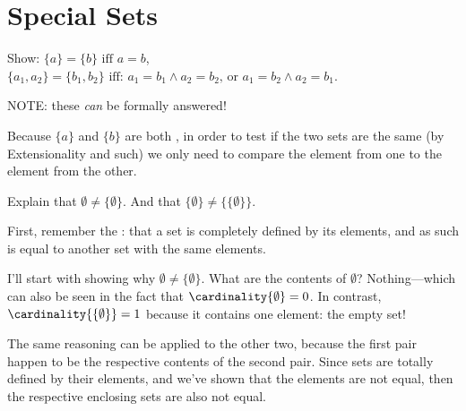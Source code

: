 \section{Special Sets}

\begin{Exercise} [number=10]
  Show:
  \Question $\{ a \} = \{ b \} \textrm{ iff } a = b$,
  \Question $\{ a_1, a_2 \} = \{ b_1, b_2 \} \textrm{ iff: } a_1 = b_1 \land a_2 = b_2 \textrm{, or } a_1 = b_2 \land a_2 = b_1$.

  NOTE: these \emph{can} be formally answered!
\end{Exercise}

\begin{Answer} [number=10.1]
  Because $\{ a \}$ and $\{ b \}$ are both , in order
  to test if the two sets are the same (by Extensionality and such) we
  only need to compare the element from one to the element from the
  other.
\end{Answer}

\begin{Exercise} [number=11]
  Explain that $\emptyset \neq \{\emptyset\}$. And that $\lbrace
  \emptyset \rbrace \neq \bigl\{\{ \emptyset \}\bigr\}$.
\end{Exercise}

\begin{Answer}
  First, remember the : that a set
  is completely defined by its elements, and as such is equal to
  another set with the same elements.
	
  I'll start with showing why $\emptyset \neq \{\emptyset\}$. What are
  the contents of $\emptyset$? Nothing---which can also be seen in the
  fact that $\cardinality{\emptyset} = 0$.  In contrast,
  $\cardinality{ \{ \emptyset \} } = 1$ because it contains one
  element: the empty set!

  The same reasoning can be applied to the other two, because the
  first pair happen to be the respective contents of the second
  pair. Since sets are totally defined by their elements, and we've
  shown that the elements are not equal, then the respective enclosing
  sets are also not equal.
\end{Answer}